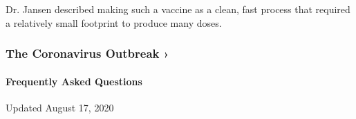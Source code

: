 Dr. Jansen described making such a vaccine as a clean, fast process that
required a relatively small footprint to produce many doses.

\href{https://www.nytimes3xbfgragh.onion/news-event/coronavirus?action=click\&pgtype=Article\&state=default\&region=MAIN_CONTENT_3\&context=storylines_faq}{}

\hypertarget{the-coronavirus-outbreak-}{%
\subsubsection{The Coronavirus Outbreak
›}\label{the-coronavirus-outbreak-}}

\hypertarget{frequently-asked-questions}{%
\paragraph{Frequently Asked
Questions}\label{frequently-asked-questions}}

Updated August 17, 2020

